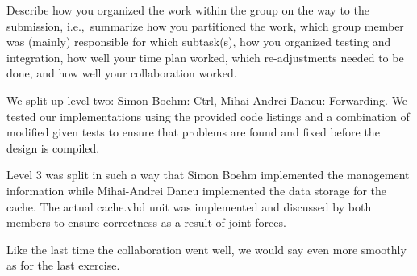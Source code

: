 Describe how you organized the work within the group on the way to the 
submission, i.e.,~summarize how you partitioned the work, which group 
member was (mainly) responsible for which subtask(s), how you organized 
testing and integration, how well your time plan worked, which 
re-adjustments needed to be done, and how well your collaboration 
worked.

	We split up level two: Simon Boehm: Ctrl, Mihai-Andrei Dancu: Forwarding.
We tested our implementations using the provided code listings and a combination of
modified given tests to ensure that problems are found and fixed before the design 
is compiled.

	Level 3 was split in such a way that Simon Boehm implemented the management
information while Mihai-Andrei Dancu implemented the data storage for the cache. The
actual cache.vhd unit was implemented and discussed by both members to ensure correctness
as a result of joint forces. 

	Like the last time the collaboration went well, we would say even more smoothly 
as for the last exercise.
